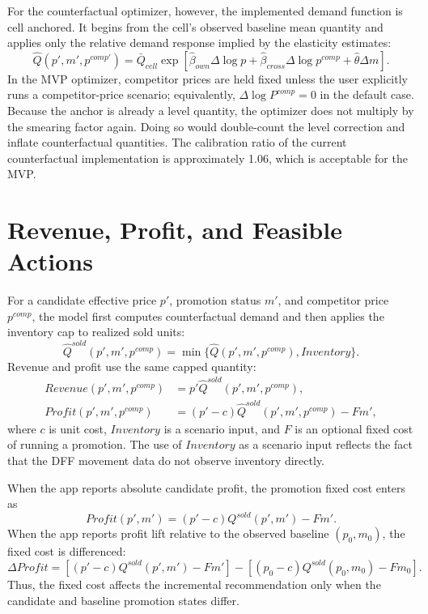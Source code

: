 \documentclass[11pt]{article}
\begin{document}
For the counterfactual optimizer, however, the implemented demand function is cell anchored. It begins from the cell's observed baseline mean quantity and applies only the relative demand response implied by the elasticity estimates:
\begin{equation}
\widehat{Q}(p',m',p^{comp\prime})=
\bar{Q}_{cell}\exp\left[
\widehat{\beta}_{own}\Delta\log p
+\widehat{\beta}_{cross}\Delta\log p^{comp}
+\widehat{\theta}\Delta m
\right].
\label{eq:anchored-q}
\end{equation}
In the MVP optimizer, competitor prices are held fixed unless the user explicitly runs a competitor-price scenario; equivalently, $\Delta\log P^{comp}=0$ in the default case. Because the anchor is already a level quantity, the optimizer does not multiply by the smearing factor again. Doing so would double-count the level correction and inflate counterfactual quantities. The calibration ratio of the current counterfactual implementation is approximately 1.06, which is acceptable for the MVP.

\section{Revenue, Profit, and Feasible Actions}

For a candidate effective price $p'$, promotion status $m'$, and competitor price $p^{comp}$, the model first computes counterfactual demand and then applies the inventory cap to realized sold units:
\begin{equation}
\widehat{Q}^{sold}(p',m',p^{comp})
=
\min\{\widehat{Q}(p',m',p^{comp}),Inventory\}.
\end{equation}
Revenue and profit use the same capped quantity:
\begin{align}
Revenue(p',m',p^{comp})
&=
p'\widehat{Q}^{sold}(p',m',p^{comp}), \\
Profit(p',m',p^{comp})
&=
(p'-c)\widehat{Q}^{sold}(p',m',p^{comp})-Fm',
\label{eq:profit}
\end{align}
where $c$ is unit cost, $Inventory$ is a scenario input, and $F$ is an optional fixed cost of running a promotion. The use of $Inventory$ as a scenario input reflects the fact that the DFF movement data do not observe inventory directly.

When the app reports absolute candidate profit, the promotion fixed cost enters as
\begin{equation}
Profit(p',m')=(p'-c)Q^{sold}(p',m')-Fm'.
\end{equation}
When the app reports profit lift relative to the observed baseline $(p_0,m_0)$, the fixed cost is differenced:
\begin{equation}
\Delta Profit =
\left[(p'-c)Q^{sold}(p',m')-Fm'\right]
-
\left[(p_0-c)Q^{sold}(p_0,m_0)-Fm_0\right].
\end{equation}
Thus, the fixed cost affects the incremental recommendation only when the candidate and baseline promotion states differ.
\end{document}
